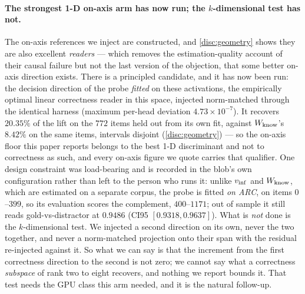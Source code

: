 \paragraph{The strongest 1-D on-axis arm has now run; the $k$-dimensional test has
not.}
The on-axis references we inject are constructed, and \cref{disc:geometry} shows
they are also excellent \emph{readers} --- which removes the estimation-quality
account of their causal failure but not the last version of the objection, that some
better on-axis direction exists. There is a principled candidate, and it has now been
run: the decision direction of the probe \emph{fitted} on these activations, the
empirically optimal linear correctness reader in this space, injected norm-matched
through the identical harness (maximum per-head deviation $4.73\times10^{-7}$). It
recovers $20.35\%$ of the lift on the $772$ items held out from its own fit, against
$W_{\mathrm{know}}$'s $8.42\%$ on the same items, intervals disjoint (\cref{disc:geometry}) --- so
the on-axis floor this paper reports belongs to the best 1-D discriminant and not to
correctness as such, and every on-axis figure we quote carries that qualifier. One
design constraint was load-bearing and is recorded in the blob's own configuration
rather than left to the person who runs it: unlike $v_{\mathrm{inf}}$ and $W_{\mathrm{know}}$, which are
estimated on a separate corpus, the probe is fitted \emph{on ARC}, on items
$0$--$399$, so its evaluation scores the complement, $400$--$1171$; out of sample it
still reads gold-vs-distractor at $0.9486$ (CI95 $[0.9318, 0.9637]$).
What is \emph{not} done is the $k$-dimensional test. We injected a second direction on
its own, never the two together, and never a norm-matched projection onto their span
with the residual re-injected against it. So what we can say is that the increment
from the first correctness direction to the second is not zero; we cannot say what a
correctness \emph{subspace} of rank two to eight recovers, and nothing we report
bounds it. That test needs the GPU class this arm needed, and it is the natural
follow-up.

